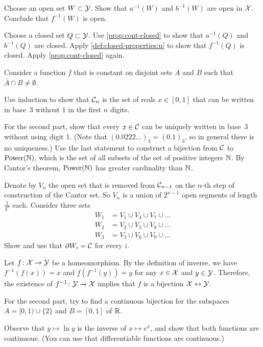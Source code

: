 Choose an open set $W\subset \mathcal{Y}$.
Show that $a^{-1}(W)$ and $b^{-1}(W)$ are open in $\mathcal{X}$.
Conclude that $f^{-1}(W)$ is open.

Choose a closed set $Q\subset \mathcal{Y}$.
Use \ref{prop:cont-closed} to show that $a^{-1}(Q)$ and $b^{-1}(Q)$ are closed.
Apply \ref{def:closed-properties:u} to show that $f^{-1}(Q)$ is closed.
Apply \ref{prop:cont-closed} again.

Consider a function $f$ that is constant on disjoint sets $A$ and $B$ such that $\bar A\cap B\ne\emptyset$.

Use induction to show that $\mathcal{C}_n$ is the set of reals $x\in [0,1]$ that can be written in base~$3$ without $1$ in the first $n$ digits.

For the second part, show that every $x\in \mathcal{C}$ can be uniquely written in base~$3$ without using digit 1.
(Note that $(0.0222\ldots)_3=(0.1)_3$, so in general there is no uniqueness.)
Use the last statement to construct a bijection from $\mathcal{C}$ to $\mathrm{Power}(\mathbb{N})$, which is the set of all subsets of the set of positive integers $\mathbb{N}$.
By Cantor's theorem, $\mathrm{Power}(\mathbb{N})$ has greater cardinality than $\mathbb{N}$.

Denote by $V_n$ the open set that is removed from $\mathcal{C}_{n-1}$ on the $n$-th step of construction of the Cantor set.
So $V_n$ is a union of $2^{n-1}$ open segments of length $\tfrac1{3^n}$ each.
Consider three sets
\begin{align*}
W_1&=V_1\cup V_4\cup V_7\cup\ldots
\\
W_2&=V_2\cup V_5\cup V_8\cup\ldots
\\
W_3&=V_3\cup V_6\cup V_9\cup\ldots
\end{align*}
Show and use that $\partial W_i=\mathcal{C}$ for every $i$.

Let $f\colon\mathcal{X}\to\mathcal{Y}$ be a homeomorphism.
By the definition of inverse, we have $f^{-1}(f(x))=x$ and $f(f^{-1}(y))=y$ for any $x\in \mathcal{X}$ and $y\in\mathcal{Y}$.
Therefore, the existence of $f^{-1}\colon\mathcal{Y}\to\mathcal{X}$ implies that $f$ is a bijection $\mathcal{X}\leftrightarrow\mathcal{Y}$.

For the second part,
try to find a continuous bijection for the subspaces $A=[0,1)\cup \{2\}$ and $B=[0,1]$ of $\mathbb{R}$.

Observe that $y\mapsto \ln y$ is the inverse of $x\mapsto e^x$,
and show that both functions are continuous.
(You can use that differentiable functions are continuous.)

